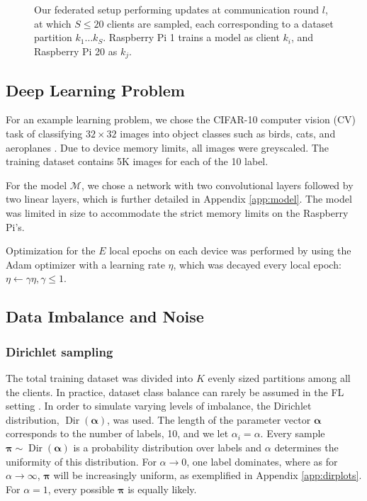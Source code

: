 \documentclass{article}
\begin{document}
\begin{figure}[htb!]
    \centering
    
    \caption{
        Our federated setup performing updates at communication round $l$, at which $S\leq 20$ clients are sampled, each corresponding to a dataset partition $k_1\ldots k_{S}$.
        Raspberry Pi 1 trains a model as client $k_i$, and Raspberry Pi 20 as $k_j$.
    }
    \label{fig:setup}
\end{figure}\noindent

\subsection{Deep Learning Problem}
For an example learning problem, we chose the CIFAR-10 computer vision (CV) task of classifying $32\times 32$ images into object classes such as birds, cats, and aeroplanes \cite{alex2009learning}.
Due to device memory limits, all images were greyscaled.
The training dataset contains 5K images for each of the 10 label.

For the model $\mathcal M$, we chose a network with two convolutional layers followed by two linear layers, which is further detailed in Appendix \ref{app:model}.
The model was limited in size to accommodate the strict memory limits on the Raspberry Pi's.

Optimization for the $E$ local epochs on each device was performed by using the Adam optimizer \cite{kingma2015adam} with a learning rate $\eta$, which was decayed every local epoch: $\eta\leftarrow\gamma\eta, \gamma\le 1$.

\subsection{Data Imbalance and Noise}
\subsubsection{Dirichlet sampling}
The total training dataset was divided into $K$ evenly sized partitions among all the clients.
In practice, dataset class balance can rarely be assumed in the FL setting \cite{kai2021advances}.
In order to simulate varying levels of imbalance, the Dirichlet distribution, $\operatorname{Dir}(\bm\alpha)$, was used.
The length of the parameter vector  $\bm\alpha$ corresponds to the number of labels, 10, and we let $\alpha_i=\alpha$.
Every sample $\bm\pi\sim\operatorname{Dir}(\bm\alpha)$ is a probability distribution over labels and $\alpha$ determines the uniformity of this distribution.
For $\alpha\to0$, one label dominates, where as for $\alpha\to\infty$, $\bm\pi$ will be increasingly uniform, as exemplified in Appendix \ref{app:dirplots}.
For $\alpha=1$, every possible $\bm\pi$ is equally likely.
\end{document}
